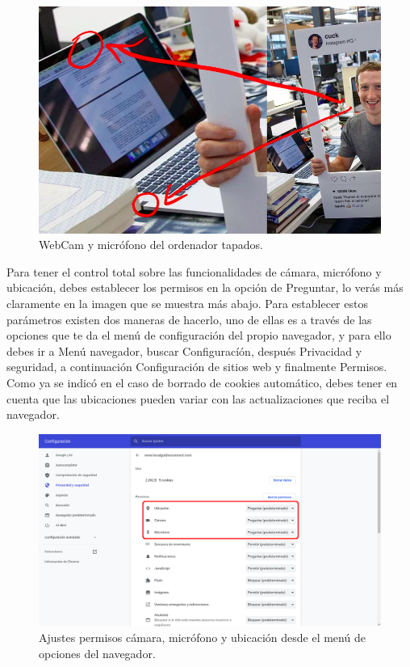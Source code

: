 \documentclass[
  a4paper,
  openany]{book}
\begin{document}
\begin{figure}

{\centering \includegraphics[width=0.75\linewidth]{images/webca-mark-zuckerberg} 

}

\caption{WebCam y micrófono del ordenador tapados.}\label{fig:unnamed-chunk-6}
\end{figure}

Para tener el control total sobre las funcionalidades de cámara, micrófono y ubicación, debes establecer los permisos en la opción de Preguntar, lo verás más claramente en la imagen que se muestra más abajo. Para establecer estos parámetros existen dos maneras de hacerlo, uno de ellas es a través de las opciones que te da el menú de configuración del propio navegador, y para ello debes ir a Menú navegador, buscar Configuracíón, después Privacidad y seguridad, a continuación Configuración de sitios web y finalmente Permisos. Como ya se indicó en el caso de borrado de cookies automático, debes tener en cuenta que las ubicaciones pueden variar con las actualizaciones que reciba el navegador.

\begin{figure}

{\centering \includegraphics[width=0.75\linewidth]{images/ajuste-permisos} 

}

\caption{Ajustes permisos cámara, micrófono y ubicación desde el menú de opciones del navegador.}\label{fig:unnamed-chunk-7}
\end{figure}
\end{document}
